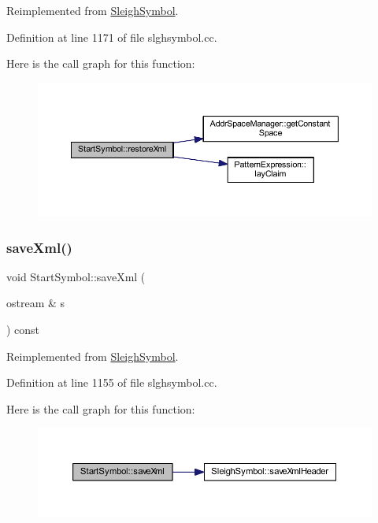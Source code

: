 Reimplemented from \mbox{\hyperlink{class_sleigh_symbol_accaec1696f99366fb0e089a7fceb56a3}{Sleigh\+Symbol}}.



Definition at line 1171 of file slghsymbol.\+cc.

Here is the call graph for this function\+:
\nopagebreak
\begin{figure}[H]
\begin{center}
\leavevmode
\includegraphics[width=350pt]{class_start_symbol_a8bffa932c38139afeacdafdbb8611c2f_cgraph}
\end{center}
\end{figure}
\mbox{\label{class_start_symbol_a112704e744706c7787bdc7a594845b47}} 
\subsubsection{\texorpdfstring{saveXml()}{saveXml()}}
{\footnotesize\ttfamily void Start\+Symbol\+::save\+Xml (\begin{DoxyParamCaption}\item[{ostream \&}]{s }\end{DoxyParamCaption}) const\hspace{0.3cm}{\ttfamily [virtual]}}



Reimplemented from \mbox{\hyperlink{class_sleigh_symbol_a83c9a32d16419d2277c5b9d542e1cf13}{Sleigh\+Symbol}}.



Definition at line 1155 of file slghsymbol.\+cc.

Here is the call graph for this function\+:
\nopagebreak
\begin{figure}[H]
\begin{center}
\leavevmode
\includegraphics[width=350pt]{class_start_symbol_a112704e744706c7787bdc7a594845b47_cgraph}
\end{center}
\end{figure}
\mbox{\label{class_start_symbol_add42ff46eba0c8adbc75164f8ac7780d}} 
